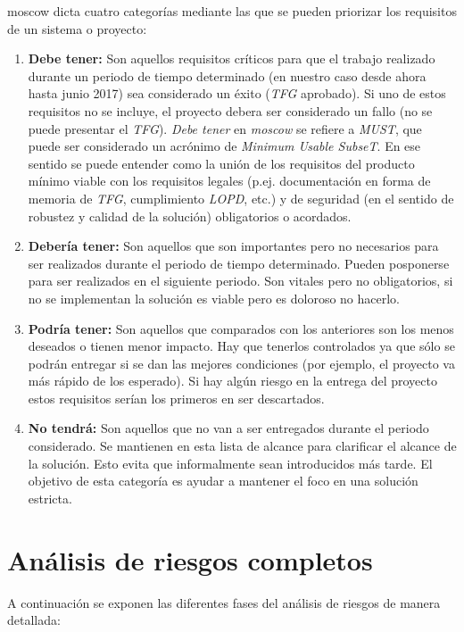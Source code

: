 \gls{moscow} dicta cuatro categorías mediante las que se pueden priorizar los requisitos de un sistema o proyecto: 

\begin{enumerate}
\item \textbf{Debe tener:} Son aquellos requisitos críticos para que el trabajo realizado durante un periodo de tiempo determinado (en nuestro caso desde ahora hasta junio 2017) sea considerado un éxito (\textit{TFG} aprobado). Si uno de estos requisitos no se incluye, el proyecto debera ser considerado un fallo (no se puede presentar el \textit{TFG}). \textit{Debe tener} en \textit{\gls{moscow}} se refiere a \textit{MUST}, que puede ser considerado un acrónimo de \textit{Minimum Usable SubseT}. En ese sentido se puede entender como la unión de los requisitos del producto mínimo viable con los requisitos legales (p.ej. documentación en forma de memoria de \textit{TFG}, cumplimiento \textit{LOPD}, etc.) y de seguridad (en el sentido de robustez y calidad de la solución) obligatorios o acordados.

\item \textbf{Debería tener:} Son aquellos que son importantes pero no necesarios para ser realizados durante el periodo de tiempo determinado. Pueden posponerse para ser realizados en el siguiente periodo. Son vitales pero no obligatorios, si no se implementan la solución es viable pero es doloroso no hacerlo.

\item \textbf{Podría tener:} Son aquellos que comparados con los anteriores son los menos deseados o tienen menor impacto. Hay que tenerlos controlados ya que sólo se podrán entregar si se dan las mejores condiciones (por ejemplo, el proyecto va más rápido de los esperado). Si hay algún riesgo en la entrega del proyecto estos requisitos serían los primeros en ser descartados.

\item \textbf{No tendrá:} Son aquellos que no van a ser entregados durante el periodo considerado. Se mantienen en esta lista de alcance para clarificar el alcance de la solución. Esto evita que informalmente sean introducidos más tarde. El objetivo de esta categoría es ayudar a mantener el foco en una solución estricta. 

\end{enumerate}

\section{Análisis de riesgos completos} \label{c.analisis.riesgos}
A continuación se exponen las diferentes fases del análisis de riesgos de manera detallada: 

